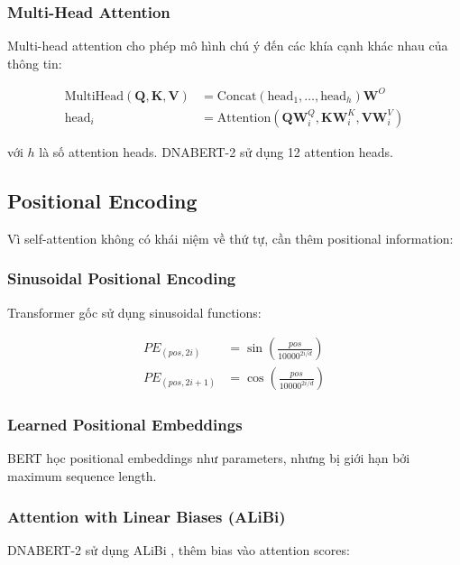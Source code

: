 \subsubsection{Multi-Head Attention}

Multi-head attention cho phép mô hình chú ý đến các khía cạnh khác nhau của thông tin:

\begin{align}
\text{MultiHead}(\mathbf{Q}, \mathbf{K}, \mathbf{V}) &= \text{Concat}(\text{head}_1, \ldots, \text{head}_h)\mathbf{W}^O \\
\text{head}_i &= \text{Attention}(\mathbf{Q}\mathbf{W}_i^Q, \mathbf{K}\mathbf{W}_i^K, \mathbf{V}\mathbf{W}_i^V)
\end{align}

với $h$ là số attention heads. DNABERT-2 sử dụng 12 attention heads.

\subsection{Positional Encoding}

Vì self-attention không có khái niệm về thứ tự, cần thêm positional information:

\subsubsection{Sinusoidal Positional Encoding}

Transformer gốc sử dụng sinusoidal functions:

\begin{align}
PE_{(pos, 2i)} &= \sin\left(\frac{pos}{10000^{2i/d}}\right) \\
PE_{(pos, 2i+1)} &= \cos\left(\frac{pos}{10000^{2i/d}}\right)
\end{align}

\subsubsection{Learned Positional Embeddings}

BERT học positional embeddings như parameters, nhưng bị giới hạn bởi maximum sequence length.

\subsubsection{Attention with Linear Biases (ALiBi)}

DNABERT-2 sử dụng ALiBi \cite{press2021train}, thêm bias vào attention scores:


